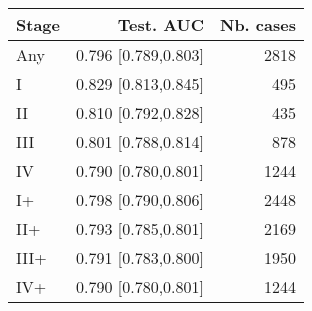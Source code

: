 \begin{table}[ht]
\centering
\begin{tabular}{lrr}
  \toprule
Stage & Test. AUC & Nb. cases \\ 
  \midrule
Any & 0.796 [0.789,0.803] & 2818 \\ 
   \addlinespace
I & 0.829 [0.813,0.845] & 495 \\ 
  II & 0.810 [0.792,0.828] & 435 \\ 
  III & 0.801 [0.788,0.814] & 878 \\ 
  IV & 0.790 [0.780,0.801] & 1244 \\ 
   \addlinespace
I+ & 0.798 [0.790,0.806] & 2448 \\ 
  II+ & 0.793 [0.785,0.801] & 2169 \\ 
  III+ & 0.791 [0.783,0.800] & 1950 \\ 
  IV+ & 0.790 [0.780,0.801] & 1244 \\ 
   \bottomrule
\end{tabular}
\end{table}
